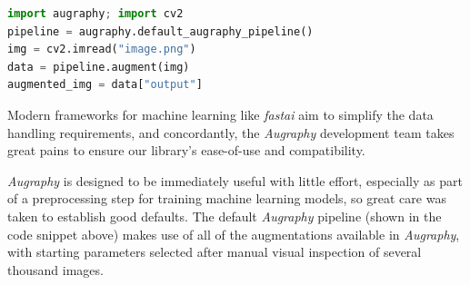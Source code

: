 \documentclass[runningheads]{llncs}
\begin{document}
\begin{lstlisting}[language=Python, label={lst:sample-code}, caption={Transforming an image with \emph{Augraphy}.}]
import augraphy; import cv2
pipeline = augraphy.default_augraphy_pipeline()
img = cv2.imread("image.png")
data = pipeline.augment(img)
augmented_img = data["output"]
\end{lstlisting}
Modern frameworks for machine learning like \emph{fastai} \cite{ref_fastai} aim to simplify the data handling requirements, and concordantly, the \emph{Augraphy} development team takes great pains to ensure our library's ease-of-use and compatibility.

\emph{Augraphy} is designed to be immediately useful with little effort, especially as part of a preprocessing step for training machine learning models, so great care was taken to establish good defaults.
The default \emph{Augraphy} pipeline (shown in the code snippet above) makes use of all of the augmentations available in \emph{Augraphy}, with starting parameters selected after manual visual inspection of several thousand images.
\end{document}

